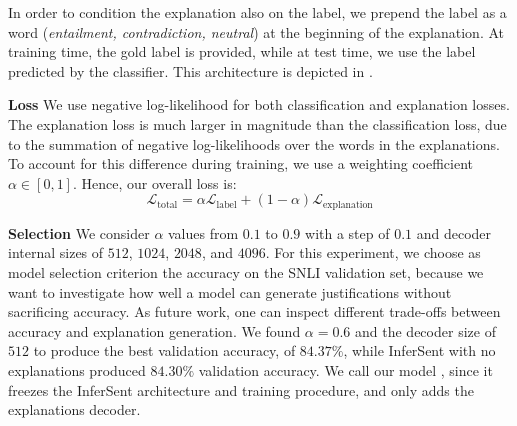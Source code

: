 In order to condition the explanation also on the label, we prepend the label as a word (\textit{entailment, contradiction, neutral}) at the beginning of the explanation. At training time, the gold label is provided, while at test time, we use the label predicted by the classifier. 
This architecture is depicted in . 


\textbf{Loss   } We use negative log-likelihood for both classification and explanation losses. The explanation loss is much larger in magnitude than the classification loss, due to the summation of negative log-likelihoods over the words in the explanations. To account for this difference during training, we use a weighting coefficient $\alpha \in [0,1]$. Hence, our overall loss is: 
\begin{equation} 
  \mathcal{L}_\text{total} = \alpha \mathcal{L}_\text{label} + (1 - \alpha) \mathcal{L}_\text{explanation}
\end{equation}

\textbf{Selection   } We consider $\alpha$ values from $0.1$ to $0.9$ with a step of $0.1$ and decoder internal sizes of $512$, $1024$, $2048$, and $4096$. For this experiment, we choose as model selection criterion the accuracy on the SNLI validation set, because we want to investigate how well a model can generate justifications without sacrificing accuracy. As future work, one can inspect different trade-offs between accuracy and explanation generation. We found $\alpha=0.6$ and the decoder size of $512$ to produce the best validation accuracy, of $84.37\%$, while InferSent with no explanations produced $84.30\%$ validation accuracy. We call our model \eInferSent{}, since it freezes the InferSent architecture and training procedure, and only adds the explanations decoder.

